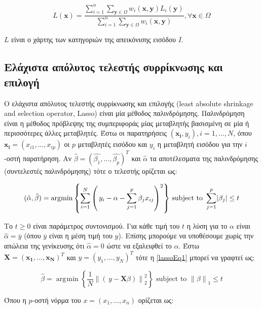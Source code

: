 \documentclass[a4paper,12pt]{article}
\DeclareMathOperator*{\argmin}{\arg\!\min}
\DeclarePairedDelimiter\abs{\lvert}{\rvert}
\newcommand\norm[1]{\left\lVert#1\right\rVert}
\begin{document}
\begin{equation} \label{label_fusion:1}
    L(\bm{x})=\frac{ \sum_{i=1}^{n}  \sum_{\bm{y}\in\Omega}
                     w_i(\bm{x},\bm{y})L_i(\bm{y})}
    { \sum_{i=1}^{n}  \sum_{\bm{y}\in\Omega} w_i(\bm{x},\bm{y}) }
    , \forall \bm{x}\in\Omega
\end{equation}

$L$ είναι ο χάρτης των κατηγοριών της απεικόνισης εισόδου $I$.

\subsection{Ελάχιστα απόλυτος τελεστής συρρίκνωσης και επιλογή} \label{lasso:1}

Ο ελάχιστα απόλυτος τελεστής συρρίκνωσης και επιλογής (least absolute shrinkage
and selection operator, Lasso) \cite{Lasso:1} είναι μία μέθοδος παλινδρόμησης.
Παλινδρόμηση είναι η μέθοδος πρόβλεψης της συμπεριφοράς μίας μεταβλητής
βασισμένη σε μία ή περισσότερες άλλες μεταβλητές. Έστω οι παρατηρήσεις
$(\bm{x_i},y_i), i=1,...,N$, όπου $\bm{x_i}=(x_{i1},...,x_{ip})$ οι $p$
μεταβλητές εισόδου και $y_i$ η μεταβλητή εισόδου για την $i$-οστή παρατήρηση. Αν
$\hat{\beta} = (\hat{{\beta}_1},...,\hat{{\beta}_p})^T$ και $\hat{\alpha}$ τα
αποτέλεσματα της παλινδρόμησης (συντελεστές παλινδρόμησης) τότε ο τελεστής
ορίζεται ως:

\begin{equation}\label{lassoEq1}
    (\hat{\alpha}, \hat{\beta}) = 
    \argmin{\left\{\sum_{i=1}^{N} {\left(\,y_i-\alpha- \sum_{j=1}^{p}
    \beta_{j}x_{ij}\right)}^2 \right\}} 
    \text{ subject to }
    \sum_{j=1}^{p} \abs{\beta_j} \leq t
\end{equation}

Το $t \geq 0$ είναι παράμετρος συντονισμού. Για κάθε τιμή του $t$ η λύση για το
$\alpha$ είναι $\hat{\alpha}=\overline{y}$ (όπου $\overline{y}$ είναι η μέση
τιμή του $y$). Επίσης μπορούμε να υποθέσουμε χωρίς την απώλεια της γενίκευσης
ότι $\hat{\alpha}=0$ ώστε να εξαλειφθεί το $\alpha$. Έστω $\bm{X} =
(\bm{x_1},...,\bm{x_N})^T$ και $y = (y_1,...,y_N)^T$ τότε η \eqref{lassoEq1}
μπορεί να γραφτεί ως:

\begin{equation}\label{lassoEq2}
    \hat{\beta} = 
    \argmin{\left\{\frac{1}{N} \norm{\left(\,y - \bm{X} \beta\right)}_2^2
    \right\}} 
    \text{ subject to }
    \norm{\beta}_1 \leq t
\end{equation}

Όπου η $p$-οστή νόρμα του $x=(x_1,...,x_n)$ ορίζεται ως:
\end{document}
